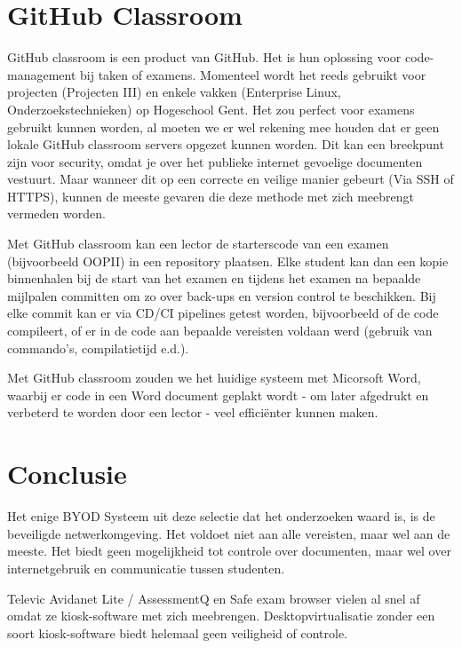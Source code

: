\section{GitHub Classroom}
\label{sec:GHC}

GitHub classroom is een product van GitHub. Het is hun oplossing voor code-management bij taken of examens. Momenteel wordt het reeds gebruikt voor projecten (Projecten III) en enkele vakken (Enterprise Linux, Onderzoekstechnieken) op Hogeschool Gent. Het zou perfect voor examens gebruikt kunnen worden, al moeten we er wel rekening mee houden dat er geen lokale GitHub classroom servers opgezet kunnen worden. Dit kan een breekpunt zijn voor security, omdat je over het publieke internet gevoelige documenten vestuurt. Maar wanneer dit op een correcte en veilige manier gebeurt (Via SSH of HTTPS), kunnen de meeste  gevaren die deze methode met zich meebrengt vermeden worden. 

Met GitHub classroom kan een lector de starterscode van een examen (bijvoorbeeld OOPII) in een repository plaatsen. Elke student kan dan een kopie binnenhalen bij de start van het examen en tijdens het examen na bepaalde mijlpalen committen om zo over back-ups en version control te beschikken. Bij elke commit kan er via CD/CI pipelines getest worden, bijvoorbeeld of de code compileert, of er in de code aan bepaalde vereisten voldaan werd (gebruik van commando's, compilatietijd e.d.). 

Met GitHub classroom zouden we het huidige systeem met Micorsoft Word, waarbij er code in een Word document geplakt wordt - om later afgedrukt en verbeterd te worden door een lector - veel effici\"{e}nter kunnen maken.  
\newpage 

\section{Conclusie}

Het enige BYOD Systeem uit deze selectie dat het onderzoeken waard is, is de beveiligde netwerkomgeving. Het voldoet niet aan alle vereisten, maar wel aan de meeste. Het biedt geen mogelijkheid tot controle over documenten, maar wel over internetgebruik en communicatie tussen studenten.

 Televic Avidanet Lite / AssessmentQ en Safe exam browser vielen al snel af omdat ze kiosk-software met zich meebrengen. Desktopvirtualisatie zonder een soort kiosk-software biedt helemaal geen veiligheid of controle. 


